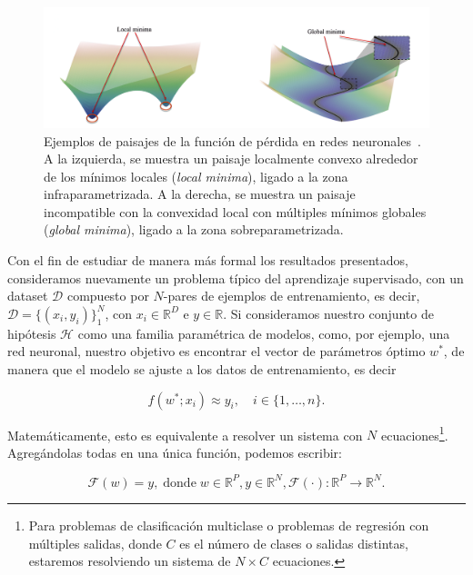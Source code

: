 \begin{figure}[h]
    \centering
    \includegraphics[width=0.8\linewidth]{img/localglobalminima.png}
    \caption[Ejemplos de paisajes de la función de pérdida en redes neuronales~\cite{Liu2021}.]{Ejemplos de paisajes de la función de pérdida en redes neuronales~\cite{Liu2021}. A la izquierda, se muestra un paisaje localmente convexo alrededor de los mínimos locales (\textit{local minima}), ligado a la zona infraparametrizada. A la derecha, se muestra un paisaje incompatible con la convexidad local con múltiples mínimos globales (\textit{global minima}), ligado a la zona sobreparametrizada.}\label{fig:localglobalminima}
\end{figure}

Con el fin de estudiar de manera más formal los resultados presentados, consideramos nuevamente un problema típico del aprendizaje supervisado, con un dataset $\mathcal{D}$ compuesto por $N$-pares de ejemplos de entrenamiento, es decir,  $\mathcal{D} = \{(x_i, y_i)\}_{1}^{N}$, con $x_i \in \mathbb{R}^{D}$ e $y \in \mathbb{R}$. Si consideramos nuestro conjunto de hipótesis $\mathcal{H}$ como una familia paramétrica de modelos, como, por ejemplo, una red neuronal, nuestro objetivo es encontrar el vector de parámetros óptimo $w^{*}$, de manera que el modelo se ajuste a los datos de entrenamiento, es decir

\[
    f(w^{*}; x_i) \approx y_i, \quad i \in \{1,\ldots,n \}.
\]

Matemáticamente, esto es equivalente a resolver un sistema con $N$ ecuaciones\footnote{Para problemas de clasificación multiclase o problemas de regresión con múltiples salidas, donde $C$ es el número de clases o salidas distintas, estaremos resolviendo un sistema de $N \times C$ ecuaciones.}. Agregándolas todas en una única función, podemos escribir:

\begin{equation}\label{eq:optimizacion-uno}
    \mathcal{F}(w) = y, \; \text{donde} \; w \in \mathbb{R}^{P}, y \in \mathbb{R}^{N}, \mathcal{F}(\cdot):\mathbb{R}^{P} \to \mathbb{R}^{N}.
\end{equation}

